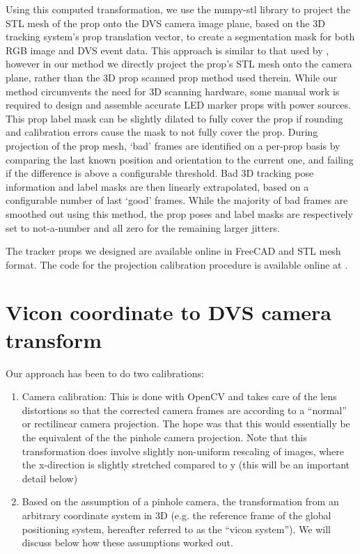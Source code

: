 \documentclass{article}
\begin{document}
Using this computed transformation, we use the numpy-stl library to project the STL mesh of the prop onto the DVS camera image plane, based on the 3D tracking system's prop translation vector, to create a segmentation mask for both RGB image and DVS event data. This approach is similar to that used by \cite{????}, however in our method we directly project the prop's STL mesh onto the camera plane, rather than the 3D prop scanned prop method used therein. While our method circumvents the need for 3D scanning hardware, some manual work is required to design and assemble accurate LED marker props with power sources. This prop label mask can be slightly dilated to fully cover the prop if rounding and calibration errors cause the mask to not fully cover the prop. During projection of the prop mesh, `bad' frames are identified on a per-prop basis by comparing the last known position and orientation to the current one, and failing if the difference is above a configurable threshold. Bad 3D tracking pose information and label masks are then linearly extrapolated, based on a configurable number of last `good' frames. While the majority of bad frames are smoothed out using this method, the prop poses and label masks are respectively set to not-a-number and all zero for the remaining larger jitters.

The tracker props we designed are available online \cite{???} in FreeCAD and STL mesh format. The code for the projection calibration procedure is available online at \cite{????}.


\section{Vicon coordinate to DVS camera transform}
Our approach has been to do two calibrations:
\begin{enumerate}
\item Camera calibration: This is done with OpenCV and takes care of the lens distortions so that the corrected camera frames are according to a ``normal'' or rectilinear camera projection. The hope was that this would essentially be the equivalent of the the pinhole camera projection. Note that this transformation does involve slightly non-uniform rescaling of images, where the x-direction is slightly stretched compared to y (this will be an important detail below)
\item Based on the assumption of a pinhole camera, the transformation from an arbitrary coordinate system in 3D (e.g. the reference frame of the global positioning system, hereafter referred to as the ``vicon system''). We will discuss below how these assumptions worked out.
\end{enumerate}
\end{document}
